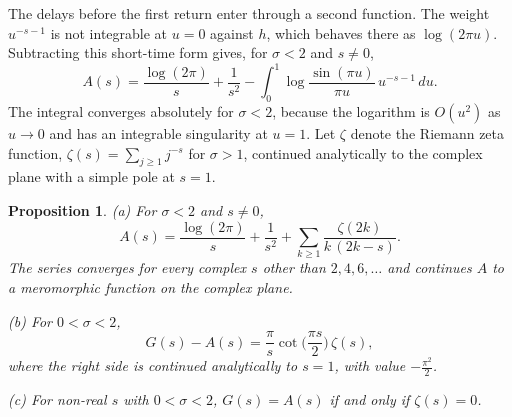 \documentclass[11pt,reqno]{amsart}
\numberwithin{equation}{section}
\theoremstyle{plain}
\newtheorem{proposition}[theorem]{Proposition}
\theoremstyle{definition}
\theoremstyle{remark}
\begin{document}
The delays before the first return enter through a second function. The weight $u^{-s-1}$ is not integrable at $u=0$ against $h$, which behaves there as $\log(2\pi u)$. Subtracting this short-time form gives, for $\sigma<2$ and $s\ne0$,
\begin{equation}\label{eq:A}
A(s)=\frac{\log(2\pi)}s+\frac1{s^2}-\int_0^1\log\frac{\sin(\pi u)}{\pi u}\,u^{-s-1}\,du .
\end{equation}
The integral converges absolutely for $\sigma<2$, because the logarithm is $O(u^2)$ as $u\to0$ and has an integrable singularity at $u=1$. Let $\zeta$ denote the Riemann zeta function, $\zeta(s)=\sum_{j\ge1}j^{-s}$ for $\sigma>1$, continued analytically to the complex plane with a simple pole at $s=1$.

\begin{proposition}\label{prop:A}
(a) For $\sigma<2$ and $s\ne0$,
\begin{equation}\label{eq:Aseries}
A(s)=\frac{\log(2\pi)}s+\frac1{s^2}+\sum_{k\ge1}\frac{\zeta(2k)}{k\,(2k-s)} .
\end{equation}
The series converges for every complex $s$ other than $2,4,6,\dots$ and continues $A$ to a meromorphic function on the complex plane.

(b) For $0<\sigma<2$,
\begin{equation}\label{eq:GAzeta}
G(s)-A(s)=\frac\pi s\cot\Big(\frac{\pi s}2\Big)\,\zeta(s),
\end{equation}
where the right side is continued analytically to $s=1$, with value $-\frac{\pi^2}2$.

(c) For non-real $s$ with $0<\sigma<2$, $G(s)=A(s)$ if and only if $\zeta(s)=0$.
\end{proposition}
\end{document}
